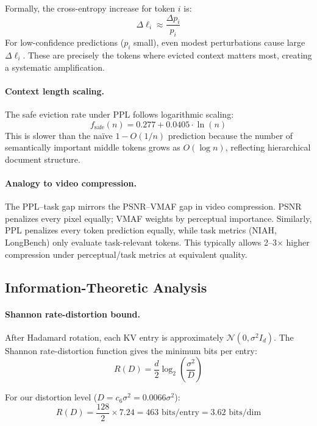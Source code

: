 Formally, the cross-entropy increase for token $i$ is:
\begin{equation}
    \Delta\ell_i \approx \frac{\Delta p_i}{p_i}
\end{equation}
For low-confidence predictions ($p_i$ small), even modest perturbations cause large $\Delta\ell_i$. These are precisely the tokens where evicted context matters most, creating a systematic amplification.

\paragraph{Context length scaling.}
The safe eviction rate under PPL follows logarithmic scaling:
\begin{equation}
    f_{\text{safe}}(n) = 0.277 + 0.0405 \cdot \ln(n)
\end{equation}
This is slower than the na\"ive $1 - O(1/n)$ prediction because the number of semantically important middle tokens grows as $O(\log n)$, reflecting hierarchical document structure.

\paragraph{Analogy to video compression.}
The PPL--task gap mirrors the PSNR--VMAF gap in video compression. PSNR penalizes every pixel equally; VMAF weights by perceptual importance. Similarly, PPL penalizes every token prediction equally, while task metrics (NIAH, LongBench) only evaluate task-relevant tokens. This typically allows 2--3$\times$ higher compression under perceptual/task metrics at equivalent quality.

\subsection{Information-Theoretic Analysis}
\label{sec:info-theory}

\paragraph{Shannon rate-distortion bound.}
After Hadamard rotation, each KV entry is approximately $\mathcal{N}(0, \sigma^2 I_d)$. The Shannon rate-distortion function gives the minimum bits per entry:
\begin{equation}
    R(D) = \frac{d}{2} \log_2\left(\frac{\sigma^2}{D}\right)
\end{equation}

For our distortion level ($D = c_6 \sigma^2 = 0.0066\sigma^2$):
\begin{equation}
    R(D) = \frac{128}{2} \times 7.24 = 463 \text{ bits/entry} = 3.62 \text{ bits/dim}
\end{equation}

